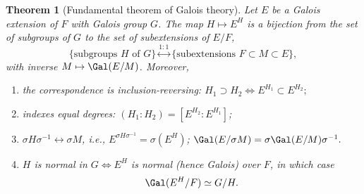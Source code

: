 \documentclass[a4paper,11pt,final,openany]{memoir}
\newtheorem{theorem}[X]{Theorem}
\theoremstyle{nonumberplain}
\begin{document}
\begin{theorem}
[Fundamental theorem of Galois theory]\label{ft17}%
%
Let $E$ be a Galois extension of $F$ with Galois group $G$. The map $H\mapsto
E^{H}$ is a bijection from the set of subgroups of $G$ to the set of
subextensions of $E/F$,
\[
\{\text{subgroups }H\text{ of }G\}\overset{1\colon1}{\leftrightarrow
}\{\text{subextensions }F\subset M\subset E\},
\]
with inverse $M\mapsto\Gal(E/M)$. Moreover,

\begin{enumerate}
\item the correspondence is inclusion-reversing: $H_{1}\supset H_{2}\iff
E^{H_{1}}\subset E^{H_{2}};$

\item indexes equal degrees: $(H_{1}\colon H_{2})=[E^{H_{2}}\colon E^{H_{1}}]$;

\item $\sigma H\sigma^{-1}\leftrightarrow\sigma M$, i.e., $E^{\sigma
H\sigma^{-1}}=\sigma(E^{H})$; $\Gal(E/\sigma M)=\sigma\Gal(E/M)\sigma^{-1}.$

\item $H$ is normal in $G\iff E^{H}$ is normal (hence Galois) over $F$, in
which case
\[
\Gal(E^{H}/F)\simeq G/H.
\]

\end{enumerate}
\end{theorem}
\end{document}
